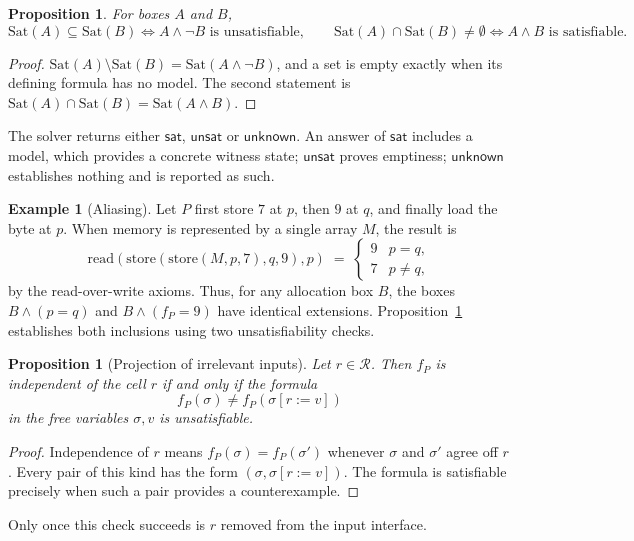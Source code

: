 \documentclass[11pt]{article}
\newtheorem{proposition}[theorem]{Proposition}
\theoremstyle{definition}
\newtheorem{example}[theorem]{Example}
\theoremstyle{remark}
\newcommand{\Sat}{\mathrm{Sat}}
\begin{document}
\begin{proposition}\label{prop:containment}
For boxes $A$ and $B$,
\[
  \Sat(A) \subseteq \Sat(B) \iff A \wedge \neg B \text{ is unsatisfiable}, \qquad
  \Sat(A) \cap \Sat(B) \neq \emptyset \iff A \wedge B \text{ is satisfiable}.
\]
\end{proposition}

\begin{proof}
$\Sat(A) \setminus \Sat(B) = \Sat(A \wedge \neg B)$, and a set is empty exactly when its defining formula has no model. The second statement is $\Sat(A) \cap \Sat(B) = \Sat(A \wedge B)$.
\end{proof}

The solver returns either $\mathsf{sat}$, $\mathsf{unsat}$ or $\mathsf{unknown}$. An answer of $\mathsf{sat}$ includes a model, which provides a concrete witness state; $\mathsf{unsat}$ proves emptiness; $\mathsf{unknown}$ establishes nothing and is reported as such.

\begin{example}[Aliasing]
Let $P$ first store $7$ at $p$, then $9$ at $q$, and finally load the byte at $p$. When memory is represented by a single array $M$, the result is
\[
  \mathrm{read}(\mathrm{store}(\mathrm{store}(M,p,7),q,9),p) \;=\;
  \begin{cases} 9 & p = q, \\ 7 & p \neq q, \end{cases}
\]
by the read-over-write axioms. Thus, for any allocation box $B$, the boxes $B \wedge (p=q)$ and $B \wedge (f_P = 9)$ have identical extensions. Proposition~\ref{prop:containment} establishes both inclusions using two unsatisfiability checks.
\end{example}

\begin{proposition}[Projection of irrelevant inputs]
Let $r \in \mathcal{R}$. Then $f_P$ is independent of the cell $r$ if and only if the formula
\[
  f_P(\sigma) \neq f_P(\sigma[r := v])
\]
in the free variables $\sigma, v$ is unsatisfiable.
\end{proposition}

\begin{proof}
Independence of $r$ means $f_P(\sigma) = f_P(\sigma')$ whenever $\sigma$ and $\sigma'$ agree off $r$. Every pair of this kind has the form $(\sigma, \sigma[r:=v])$. The formula is satisfiable precisely when such a pair provides a counterexample.
\end{proof}

Only once this check succeeds is $r$ removed from the input interface.
\end{document}

